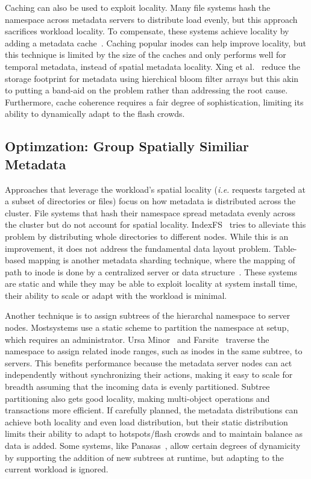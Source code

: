 Caching can also be used to exploit locality.  Many file systems hash the
namespace across metadata servers to distribute load evenly, but this approach
sacrifices workload locality. To compensate, these systems achieve locality by
adding a metadata cache~\cite{li:msst2006-dynamic, xing:sc2009-skyfs,
zhu:pds2008-hba}.  Caching popular inodes can help improve locality, but this
technique is limited by the size of the caches and only performs well for
temporal metadata, instead of spatial metadata locality. Xing et
al.~\cite{xing:sc2009-skyfs} reduce the storage footprint for metadata using
hierchical bloom filter arrays but this akin to putting a band-aid on the
problem rather than addressing the root cause.  Furthermore, cache coherence
requires a fair degree of sophistication, limiting its ability to dynamically
adapt to the flash crowds.

\subsection{Optimzation: Group Spatially Similiar Metadata}

Approaches that leverage the workload's spatial locality ({\it i.e.} requests
targeted at a subset of directories or files) focus on how metadata is
distributed across the cluster. File systems that hash their namespace spread
metadata evenly across the cluster but do not account for spatial locality.
IndexFS~\cite{patil:fast2011-giga+} tries to alleviate this problem by
distributing whole directories to different nodes.  While this is an
improvement, it does not address the fundamental data layout problem.
Table-based mapping is another metadata sharding technique, where the mapping
of path to inode is done by a centralized server or data
structure~\cite{xing:sc2009-skyfs, hildebrand:msst2005-pnfs,
thomson:fast2015-calvinfs}. These systems are static and while they may be able
to exploit locality at system install time, their ability to scale or adapt
with the workload is minimal.

Another technique is to assign subtrees of the hierarchal namespace to server
nodes. Mostsystems use a static scheme to partition the namespace at setup,
which requires an administrator. Ursa Minor~\cite{sinnamohideen:atc2010-ursa}
and Farsite~\cite{doucer:osdi2006-farsite-dir} traverse the namespace to assign
related inode ranges, such as inodes in the same subtree, to servers. This
benefits performance because the metadata server nodes can act independently
without synchronizing their actions, making it easy to scale for breadth
assuming that the incoming data is evenly partitioned.  Subtree partitioning
also gets good locality, making multi-object operations and transactions more
efficient. If carefully planned, the metadata distributions can achieve both
locality and even load distribution, but their static distribution limits their
ability to adapt to hotspots/flash crowds and to maintain balance as data is
added.  Some systems, like Panasas~\cite{welch:fast2008-panasas}, allow certain
degrees of dynamicity by supporting the addition of new subtrees at runtime,
but adapting to the current workload is ignored. 


